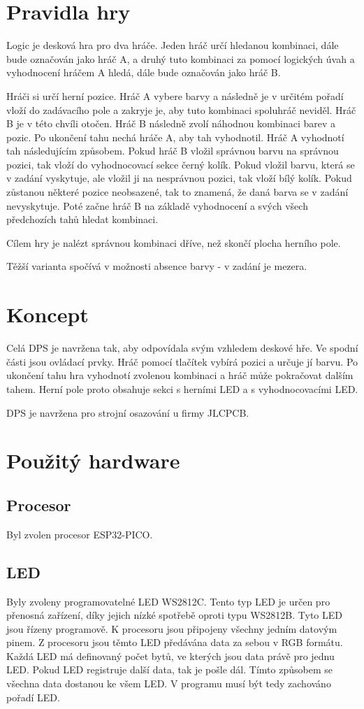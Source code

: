 \chapter{Pravidla hry}
Logic je desková hra pro dva hráče. Jeden hráč určí hledanou kombinaci, dále bude označován jako hráč A, a druhý tuto kombinaci za pomocí logických úvah a
vyhodnocení hráčem A hledá, dále bude označován jako hráč B.

Hráči si určí herní pozice. Hráč A vybere barvy a následně je v určitém pořadí vloží do zadávacího pole a zakryje je, aby tuto
kombinaci spoluhráč neviděl. Hráč B je v této chvíli otočen. Hráč B následně zvolí náhodnou kombinaci barev a pozic. Po ukončení tahu nechá
hráče A, aby tah vyhodnotil. Hráč A vyhodnotí tah následujícím způsobem. Pokud hráč B vložil správnou barvu na správnou pozici, tak vloží 
do vyhodnocovací sekce černý kolík. Pokud vložil barvu, která se v zadání vyskytuje, ale vložil ji na nesprávnou pozici, tak vloží bílý kolík.
Pokud zůstanou některé pozice neobsazené, tak to znamená, že daná barva se v zadání nevyskytuje. Poté začne hráč B na základě vyhodnocení a 
svých všech předchozích tahů hledat kombinaci.

Cílem hry je nalézt správnou kombinaci dříve, než skončí plocha herního pole.

Těžší varianta spočívá v možnosti absence barvy - v zadání je mezera.

\chapter{Koncept}
Celá DPS je navržena tak, aby odpovídala svým vzhledem deskové hře. Ve spodní části jsou ovládací prvky.
Hráč pomocí tlačítek vybírá pozici a určuje jí barvu. Po ukončení tahu hra vyhodnotí zvolenou kombinaci a hráč může pokračovat dalším tahem.
Herní pole proto obsahuje sekci s herními LED a s vyhodnocovacími LED.

DPS je navržena pro strojní osazování u firmy JLCPCB.

\chapter{Použitý hardware}
\section{Procesor}
Byl zvolen procesor ESP32-PICO.
\section{LED}
Byly zvoleny programovatelné LED WS2812C. Tento typ LED je určen pro přenosná zařízení, díky jejich nízké spotřebě oproti typu WS2812B.
Tyto LED jsou řízeny programově. K procesoru jsou připojeny všechny jedním datovým pinem. Z procesoru jsou těmto LED předávána data za sebou v
RGB formátu. Každá LED má definovaný počet bytů, ve kterých jsou data právě pro jednu LED. Pokud LED registruje další data, tak je pošle dál.
Tímto způsobem se všechna data dostanou ke všem LED. V programu musí být tedy zachováno pořadí LED. 

